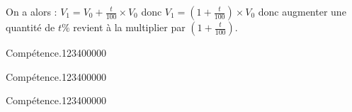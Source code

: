 \begin{pageCours}
{\begin{Pv}
On a alors : $V_1=V_0+\frac{t}{100}\times V_0$ donc $V_1=(1+\frac{t}{100})\times V_0$ donc augmenter une quantité de $t\%$ revient à la multiplier par $(1+\frac{t}{100})$.
\end{Pv}
}

\end{pageCours} %


\begin{pageAD}  %
\restoregeometry %


\begin{ExoCad}{Compétence.}{1234}{0}{0}{0}{0}{0}

\end{ExoCad}


\begin{ExoCad}{Compétence.}{1234}{0}{0}{0}{0}{0}

\end{ExoCad}


\begin{ExoCad}{Compétence.}{1234}{0}{0}{0}{0}{0}

\end{ExoCad}
 
\end{pageAD} %


